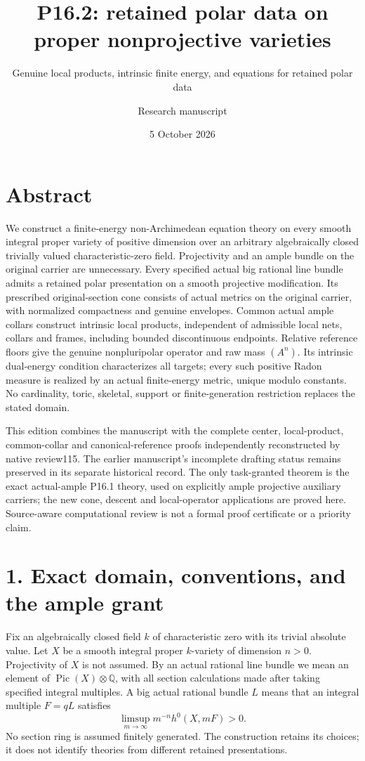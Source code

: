 \documentclass[
  10pt,
]{article}
\title{P16.2: retained polar data on proper nonprojective varieties}
\subtitle{Genuine local products, intrinsic finite energy, and equations
for retained polar data}
\author{Research manuscript}
\date{5 October 2026}
\begin{document}
\maketitle

\section{Abstract}\label{abstract}

We construct a finite-energy non-Archimedean equation theory on every
smooth integral proper variety of positive dimension over an arbitrary
algebraically closed trivially valued characteristic-zero field.
Projectivity and an ample bundle on the original carrier are
unnecessary. Every specified actual big rational line bundle admits a
retained polar presentation on a smooth projective modification. Its
prescribed original-section cone consists of actual metrics on the
original carrier, with normalized compactness and genuine envelopes.
Common actual ample collars construct intrinsic local products,
independent of admissible local nets, collars and frames, including
bounded discontinuous endpoints. Relative reference floors give the
genuine nonpluripolar operator and raw mass \((A^n)\). Its intrinsic
dual-energy condition characterizes all targets; every such positive
Radon measure is realized by an actual finite-energy metric, unique
modulo constants. No cardinality, toric, skeletal, support or
finite-generation restriction replaces the stated domain.

This edition combines the manuscript with the complete center,
local-product, common-collar and canonical-reference proofs
independently reconstructed by native review115. The earlier
manuscript's incomplete drafting status remains preserved in its
separate historical record. The only task-granted theorem is the exact
actual-ample P16.1 theory, used on explicitly ample projective auxiliary
carriers; the new cone, descent and local-operator applications are
proved here. Source-aware computational review is not a formal proof
certificate or a priority claim.

\section{1. Exact domain, conventions, and the ample
grant}\label{exact-domain-conventions-and-the-ample-grant}

Fix an algebraically closed field \(k\) of characteristic zero with its
trivial absolute value. Let \(X\) be a smooth integral proper
\(k\)-variety of dimension \(n>0\). Projectivity of \(X\) is not
assumed. By an actual rational line bundle we mean an element of
\(\operatorname{Pic}(X)\otimes\mathbb Q\), with all section calculations
made after taking specified integral multiples. A big actual rational
bundle \(L\) means that an integral multiple \(F=qL\) satisfies \[
\limsup_{m\longrightarrow\infty}m^{-n}h^0(X,mF)>0.
\] No section ring is assumed finitely generated. The construction
retains its choices; it does not identify theories from different
retained presentations.
\end{document}

